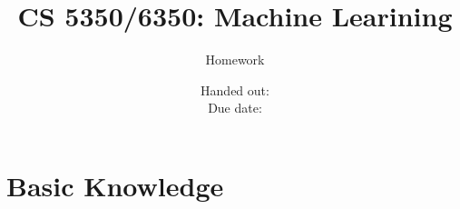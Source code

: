 \documentclass[12pt, fullpage,letterpaper]{article}
\title{CS 5350/6350: Machine Learining \semester}
\author{Homework \assignmentId}
\date{Handed out: \releaseDate\\
  Due date: \dueDate}
\begin{document}
\maketitle





\section*{Basic Knowledge}
\label{sec:q1}

\end{document}
